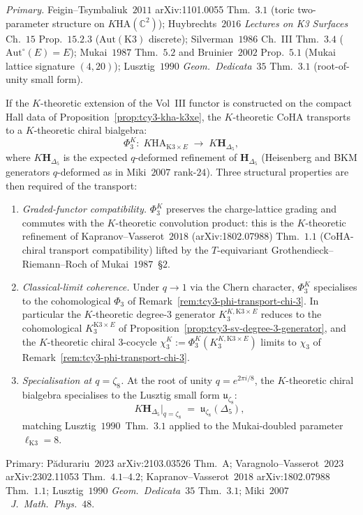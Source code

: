 \begin{proposition}
\emph{Primary.} Feigin--Tsymbaliuk~$2011$ arXiv:1101.0055 Thm.~$3.1$
(toric two-parameter structure on $K\mathrm{HA}(\mathbb{C}^2)$);
Huybrechts~$2016$ \emph{Lectures on K3 Surfaces} Ch.~$15$ Prop.~$15.2.3$
($\mathrm{Aut}(\mathrm{K3})$ discrete); Silverman~$1986$ Ch.~III Thm.~$3.4$
($\mathrm{Aut}^\circ(E) = E$); Mukai~$1987$ Thm.~$5.2$ and
Bruinier~$2002$ Prop.~$5.1$ (Mukai lattice signature $(4, 20)$);
Lusztig~$1990$ \emph{Geom.\ Dedicata}~$35$ Thm.~$3.1$ (root-of-unity
small form).
\end{proposition}

\begin{remark}
\label{rem:tcy3-phi3k}
If the $K$-theoretic extension of the Vol~III functor is constructed
on the compact Hall data of Proposition~\ref{prop:tcy3-kha-k3xe}, the
$K$-theoretic CoHA transports to a $K$-theoretic chiral bialgebra:
\[
 \Phi_3^K :\; K\mathrm{HA}_{\mathrm{K3}\times E}
 \;\longrightarrow\;
 K\mathbf{H}_{\Delta_5},
\]
where $K\mathbf{H}_{\Delta_5}$ is the expected $q$-deformed refinement of
$\mathbf{H}_{\Delta_5}$ (Heisenberg and BKM generators
$q$-deformed as in Miki~$2007$ rank-$24$). Three structural
properties are then required of the transport:
\begin{enumerate}[label=\textup{(\roman*)}]
\item \emph{Graded-functor compatibility.} $\Phi_3^K$ preserves the
charge-lattice grading and commutes with the $K$-theoretic
convolution product: this is the $K$-theoretic refinement of
Kapranov--Vasserot~$2018$ (arXiv:1802.07988) Thm.~$1.1$
(CoHA-chiral transport compatibility) lifted by the $T$-equivariant
Grothendieck--Riemann--Roch of Mukai~$1987$~\S $2$.
\item \emph{Classical-limit coherence.} Under $q \to 1$ via the
Chern character, $\Phi_3^K$ specialises to the cohomological
$\Phi_3$ of Remark~\ref{rem:tcy3-phi-transport-chi-3}. In particular
the $K$-theoretic degree-$3$ generator $K_3^{K, \mathrm{K3}\times E}$
reduces to the cohomological
$K_3^{\mathrm{K3}\times E}$ of Proposition~\ref{prop:tcy3-sv-degree-3-generator},
and the $K$-theoretic chiral $3$-cocycle
$\chi_3^K := \Phi_3^K(K_3^{K, \mathrm{K3}\times E})$ limits to
$\chi_3$ of Remark~\ref{rem:tcy3-phi-transport-chi-3}.
\item \emph{Specialisation at $q = \zeta_8$.} At the root of unity
$q = e^{2\pi i/8}$, the $K$-theoretic chiral bialgebra specialises
to the Lusztig small form $\mathfrak u_{\zeta_8}$:
\[
 K\mathbf{H}_{\Delta_5}\bigl|_{q = \zeta_8}
 \;=\;
 \mathfrak u_{\zeta_8}(\Delta_5),
\]
matching Lusztig~$1990$~Thm.~$3.1$ applied to the Mukai-doubled
parameter $\ell_{\mathrm{K3}} = 8$.
\end{enumerate}
Primary: P\u{a}durariu~$2023$ arXiv:2103.03526 Thm.~A; Varagnolo--Vasserot~$2023$
arXiv:2302.11053 Thm.~$4.1$--$4.2$; Kapranov--Vasserot~$2018$
arXiv:1802.07988 Thm.~$1.1$; Lusztig~$1990$ \emph{Geom.\ Dedicata}~$35$
Thm.~$3.1$; Miki~$2007$~\emph{J.~Math.~Phys.}~$48$.
\end{remark}

